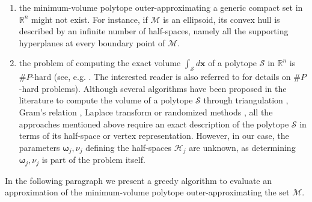 \documentclass[twocolumn]{autart}
\newcommand{\DP}[1]{{#1}}
\begin{document}
\begin{enumerate}
  \item the  minimum-volume polytope outer-approximating  a generic compact set in $\mathbb{R}^n$ might not exist. For instance, if $\mathcal{M}$ is an ellipsoid, its  convex hull is described by an infinite number of half-spaces, namely all the supporting hyperplanes at every boundary point of  $\mathcal{M}$.
       \item the problem of computing the exact volume $\int_\mathcal{S} d\mathbf{x}$ of a polytope $\mathcal{S}$ in $\mathbb{R}^n$ is $\#P$-hard (see, e.g. \cite{dyer1988complexity,bueler2000exact}. \DP{The interested reader is also referred to \cite{arora2009computational} for  details on $\#P$-hard problems).}   Although several algorithms have been proposed in the literature to compute the volume of a polytope  $\mathcal{S}$ through triangulation  \cite{cohen1979two,allgower1986computing,lasserre1983analytical,bemporad2004inner}, Gram's relation \cite{lawrence1991polytope}, Laplace transform \cite{lasserre2001laplace} or randomized methods \cite{smith1984efficient,dyer1991random,wiback2004monte}, all the approaches mentioned above require an exact description of the polytope $\mathcal{S}$ in terms of its half-space or vertex representation. However, in our case, the parameters $\boldsymbol{\omega}_j,\nu_j$ defining the half-spaces $\mathcal{H}_j$ are unknown, as determining $\boldsymbol{\omega}_j,\nu_j$ is part of  the problem itself.
\end{enumerate}
 In the following paragraph we present a greedy algorithm   to evaluate an approximation of the minimum-volume polytope   outer-approximating the set $\mathcal{M}$. %
%

\end{document}
